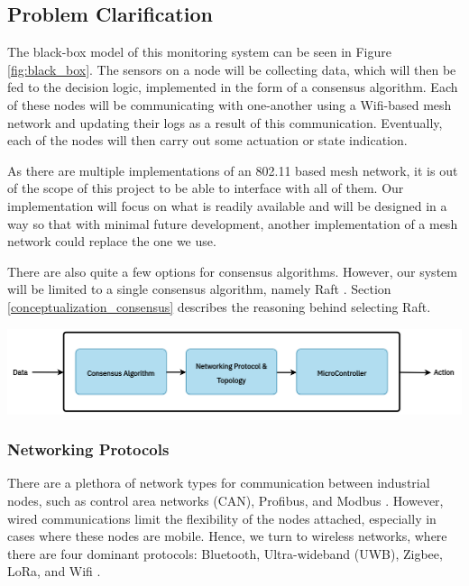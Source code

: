 \subsection{Problem Clarification}


The black-box model of this monitoring system can be seen in Figure \ref{fig:black_box}. The sensors on a node will be collecting data, which will then be fed to the decision logic, implemented in the form of a consensus algorithm. Each of these nodes will be communicating with one-another using a Wifi-based mesh network and updating their logs as a result of this communication. Eventually, each of the nodes will then carry out some actuation or state indication.

As there are multiple implementations of an 802.11 based mesh network, it is out of the scope of this project to be able to interface with all of them. Our implementation will focus on what is readily available and will be designed in a way so that with minimal future development, another implementation of a mesh network could replace the one we use.

There are also quite a few options for consensus algorithms. However, our system will be limited to a single consensus algorithm, namely Raft \cite{raft_paper}. Section \ref{conceptualization_consensus} describes the reasoning behind selecting Raft.

\begingroup
    \centering
    \medskip
    \includegraphics[width=0.95\columnwidth]{final-proposal/images/blackbox.png}
    \label{fig:black_box}
\endgroup

\subsubsection{Networking Protocols}
There are a plethora of network types for communication between industrial nodes, such as control area networks (CAN), Profibus, and Modbus \cite{lee2007comparative}. However, wired communications limit the flexibility of the nodes attached, especially in cases where these nodes are mobile. Hence, we turn to wireless networks, where there are four dominant protocols: Bluetooth, Ultra-wideband (UWB), Zigbee, LoRa, and Wifi \cite{lee2007comparative, ti_lethaby2017wireless}.

